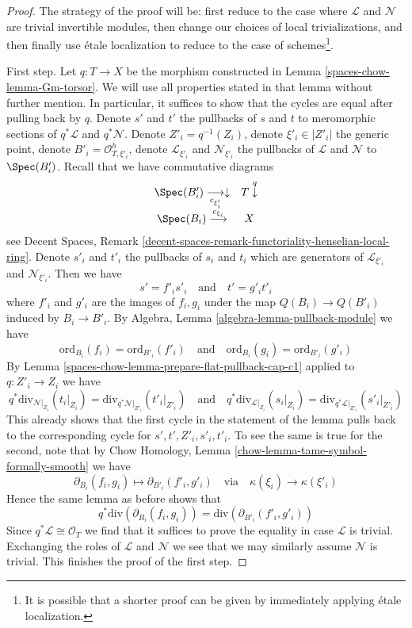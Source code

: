 \begin{proof}
The strategy of the proof will be: first reduce to the case where
$\mathcal{L}$ and $\mathcal{N}$ are trivial invertible modules,
then change our choices of local trivializations, and then finally
use \'etale localization to reduce to the case of schemes\footnote{It
is possible that a shorter proof can be given by immediately
applying \'etale localization.}.

\medskip\noindent
First step. Let $q : T \to X$ be the morphism constructed in
Lemma \ref{spaces-chow-lemma-Gm-torsor}. We will use all properties stated in
that lemma without further mention. In particular, it suffices to
show that the cycles are equal after pulling back by $q$.
Denote $s'$ and $t'$ the pullbacks of $s$ and $t$ to meromorphic sections
of $q^*\mathcal{L}$ and $q^*\mathcal{N}$.
Denote $Z'_i = q^{-1}(Z_i)$, denote $\xi'_i \in |Z'_i|$ the generic point,
denote $B'_i = \mathcal{O}_{T, \xi'_i}^h$, denote
$\mathcal{L}_{\xi'_i}$ and $\mathcal{N}_{\xi'_i}$ the pullbacks
of $\mathcal{L}$ and $\mathcal{N}$ to $\Spec(B'_i)$.
Recall that we have commutative diagrams
$$
\begin{array}{cc}\Spec(B'_i) \underset{c_{\xi'_i}}{\longrightarrow}\downarrow & T \overset{q}{\downarrow} \\ \Spec(B_i) \overset{c_{\xi_i}}{\longrightarrow} & X\end{array}
$$
see Decent Spaces, Remark
\ref{decent-spaces-remark-functoriality-henselian-local-ring}.
Denote $s'_i$ and $t'_i$ the pullbacks of $s_i$ and $t_i$ which
are generators of $\mathcal{L}_{\xi'_i}$ and $\mathcal{N}_{\xi'_i}$.
Then we have
$$
s' = f'_i s'_i
\quad\text{and}\quad
t' = g'_i t'_i
$$
where $f'_i$ and $g'_i$ are the images of $f_i, g_i$
under the map $Q(B_i) \to Q(B'_i)$ induced by $B_i \to B'_i$.
By Algebra, Lemma \ref{algebra-lemma-pullback-module} we have
$$
\text{ord}_{B_i}(f_i) = \text{ord}_{B'_i}(f'_i)
\quad\text{and}\quad
\text{ord}_{B_i}(g_i) = \text{ord}_{B'_i}(g'_i)
$$
By Lemma \ref{spaces-chow-lemma-prepare-flat-pullback-cap-c1} applied
to $q : Z'_i \to Z_i$ we have
$$
q^*\text{div}_{\mathcal{N}|_{Z_i}}(t_i|_{Z_i}) =
\text{div}_{q^*\mathcal{N}|_{Z'_i}}(t'_i|_{Z'_i})
\quad\text{and}\quad
q^*\text{div}_{\mathcal{L}|_{Z_i}}(s_i|_{Z_i}) =
\text{div}_{q^*\mathcal{L}|_{Z'_i}}(s'_i|_{Z'_i})
$$
This already shows that the first cycle in the statement of the
lemma pulls back to the corresponding cycle for
$s', t', Z'_i, s'_i, t'_i$. To see the same is true for the
second, note that by
Chow Homology, Lemma \ref{chow-lemma-tame-symbol-formally-smooth} we have
$$
\partial_{B_i}(f_i, g_i) \mapsto
\partial_{B'_i}(f'_i, g'_i)
\quad\text{via}\quad
\kappa(\xi_i) \to \kappa(\xi'_i)
$$
Hence the same lemma as before shows that
$$
q^*\text{div}(\partial_{B_i}(f_i, g_i)) =
\text{div}(\partial_{B'_i}(f'_i, g'_i))
$$
Since $q^*\mathcal{L} \cong \mathcal{O}_T$ we find that it suffices
to prove the equality in case $\mathcal{L}$ is trivial.
Exchanging the roles of $\mathcal{L}$ and $\mathcal{N}$ we
see that we may similarly assume $\mathcal{N}$ is trivial.
This finishes the proof of the first step.


\end{proof}
